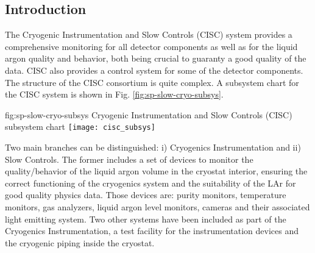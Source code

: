 \subsection{Introduction}
\label{sec:fddp-slow-cryo-intro}



The Cryogenic Instrumentation and Slow Controls (CISC) system provides
a comprehensive monitoring for all detector components as well as for the liquid argon quality and behavior, both being crucial
to guaranty a good quality of the data. CISC also provides a control system for some of the detector components. 
The structure of the CISC consortium is quite complex. A subsystem chart
for the CISC system is shown in Fig. \ref{fig:sp-slow-cryo-subsys}. 

\begin{dunefigure}{fig:sp-slow-cryo-subsys}
{Cryogenic Instrumentation and Slow Controls (CISC) subsystem chart}
\texttt{[image: cisc\_subsys]}
\end{dunefigure}

Two main branches can be distinguished: i) Cryogenics Instrumentation and ii) Slow Controls. The former includes a set of devices 
to monitor the quality/behavior of the liquid argon volume in the cryostat interior, ensuring the correct functioning of
the cryogenics system and the suitability of the LAr for good quality physics data. Those devices are:
purity monitors, temperature monitors, gas analyzers, liquid argon level monitors, cameras and their associated
light emitting system. Two other systems have been included as part of the Cryogenics Instrumentation,  
a test facility for the instrumentation devices and the cryogenic piping inside the cryostat.

